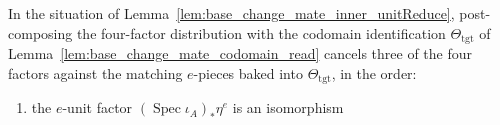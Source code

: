 \begin{lemma}

  \label{lem:base_change_mate_inner_eCancel}
  In the situation of Lemma~\ref{lem:base_change_mate_inner_unitReduce}, post-composing the
  four-factor distribution with the codomain identification \(\Theta_{\mathrm{tgt}}\) of
  Lemma~\ref{lem:base_change_mate_codomain_read} cancels three of the four factors against the
  matching \(e\)-pieces baked into \(\Theta_{\mathrm{tgt}}\), in the order:
  \begin{enumerate}
    \item the \(e\)-unit factor \((\operatorname{Spec}\iota_A)_{*}\eta^{e}\) is an isomorphism

\end{enumerate}
\end{lemma}

